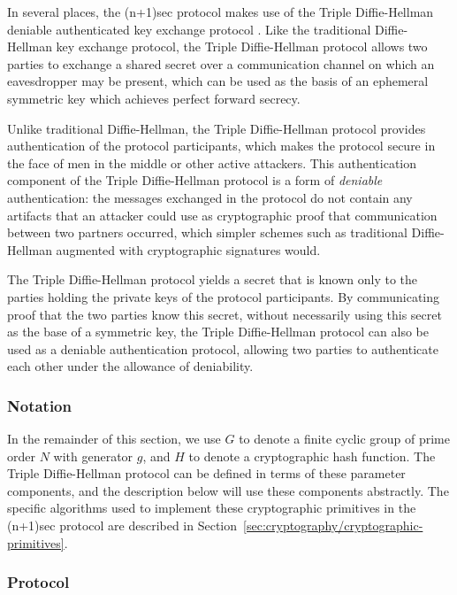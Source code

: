 \documentclass{article}
\begin{document}
In several places, the (n+1)sec protocol makes use of the Triple Diffie-Hellman deniable authenticated key exchange protocol \cite{tdh}.
Like the traditional Diffie-Hellman key exchange protocol, the Triple Diffie-Hellman protocol allows two parties to exchange a shared secret over a communication channel on which an eavesdropper may be present, which can be used as the basis of an ephemeral symmetric key which achieves perfect forward secrecy.

Unlike traditional Diffie-Hellman, the Triple Diffie-Hellman protocol provides authentication of the protocol participants, which makes the protocol secure in the face of men in the middle or other active attackers.
This authentication component of the Triple Diffie-Hellman protocol is a form of \emph{deniable} authentication: the messages exchanged in the protocol do not contain any artifacts that an attacker could use as cryptographic proof that communication between two partners occurred, which simpler schemes such as traditional Diffie-Hellman augmented with cryptographic signatures would.

The Triple Diffie-Hellman protocol yields a secret that is known only to the parties holding the private keys of the protocol participants.
By communicating proof that the two parties know this secret, without necessarily using this secret as the base of a symmetric key, the Triple Diffie-Hellman protocol can also be used as a deniable authentication protocol, allowing two parties to authenticate each other under the allowance of deniability.


\subsubsection{Notation}
\label{sec:cryptography/triple-diffie-hellman/notation}

In the remainder of this section, we use $G$ to denote a finite cyclic group of prime order $N$ with generator $g$, and $H$ to denote a cryptographic hash function.
The Triple Diffie-Hellman protocol can be defined in terms of these parameter components, and the description below will use these components abstractly.
The specific algorithms used to implement these cryptographic primitives in the (n+1)sec protocol are described in Section~\ref{sec:cryptography/cryptographic-primitives}.


\subsubsection{Protocol}
\label{sec:cryptography/triple-diffie-hellman/protocol}
\end{document}
